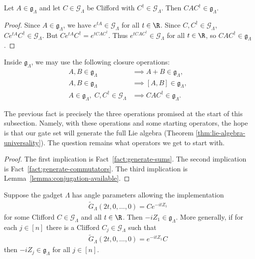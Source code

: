 \begin{lemma}
\label{lemma:conjugation-available}
Let $A \in \mathfrak{g}_\Lambda$ and let $C \in \mathcal{G}_\Lambda$ be Clifford with $C^\dagger \in \mathcal{G}_\Lambda$. Then
$
    CAC^\dagger
    \in
    \mathfrak{g}_\Lambda.
$
\end{lemma}

\begin{proof}
Since $A \in \mathfrak{g}_\Lambda$, we have $e^{tA} \in \mathcal{G}_\Lambda$ for all $t \in \R$. Since $C,C^\dagger \in \mathcal{G}_\Lambda$,
$
    C e^{tA} C^\dagger
    \in
    \mathcal{G}_\Lambda.
$
But
$
    C e^{tA} C^\dagger
    =
    e^{tCAC^\dagger}.
$
Thus $e^{tCAC^\dagger} \in \mathcal{G}_\Lambda$ for all $t \in \R$, so $CAC^\dagger \in \mathfrak{g}_\Lambda$.
\end{proof}

\begin{fact}
\label{fact:allowed-lie-operations}
Inside $\mathfrak{g}_\Lambda$, we may use the following closure operations:
\begin{align}
    A,B \in \mathfrak{g}_\Lambda
    &\implies
    A+B \in \mathfrak{g}_\Lambda, \\
    A,B \in \mathfrak{g}_\Lambda
    &\implies
    [A,B] \in \mathfrak{g}_\Lambda, \\
    A\in\mathfrak g_\Lambda,\; C,C^\dagger\in\mathcal G_\Lambda
    &\implies CAC^\dagger\in\mathfrak g_\Lambda.
\end{align}
\end{fact}

The previous fact is precisely the three operations promised at the start of this subsection. Namely, with these operations and some starting operators, the hope is that our gate set will generate the full Lie algebra (Theorem \ref{thm:lie-algebra-universality}). The question remains what operators we get to start with.

\begin{proof}
The first implication is Fact~\ref{fact:generate-sums}. The second implication is Fact~\ref{fact:generate-commutators}. The third implication is Lemma~\ref{lemma:conjugation-available}.
\end{proof}

\begin{fact}
\label{fact:initial-z-rotations}
Suppose the gadget $\Lambda$ has angle parameters allowing the implementation
\begin{align}
    \widetilde{G}_\Lambda(2t,0,\ldots,0)
    =
    C e^{-itZ_1}
\end{align}
for some Clifford $C \in \mathcal{G}_\Lambda$ and all $t \in \R$. Then
$
    -iZ_1
    \in
    \mathfrak{g}_\Lambda.
$
More generally, if for each $j \in [n]$ there is a Clifford $C_j \in \mathcal{G}_\Lambda$ such that
\begin{align}
    \widetilde G_\Lambda(2t,0,\ldots,0)=e^{-itZ_1}C
\end{align}
then
$
    -iZ_j
    \in
    \mathfrak{g}_\Lambda
$
for all $j \in [n]$.
\end{fact}

